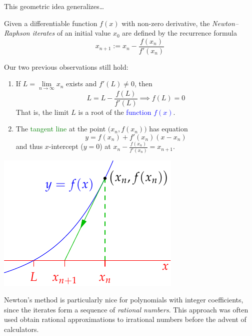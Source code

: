 \goodbreak


This geometric idea generalizes\ldots

\begin{defn}{}{}
	Given a differentiable function $f(x)$ with non-zero derivative, the \emph{Newton--Raphson iterates} of an initial value $x_0$ are defined by the recurrence formula
	\[
		x_{n+1}:=x_n-\frac{f(x_n)}{f'(x_n)}
	\]
\end{defn}

\begin{minipage}[t]{0.6\linewidth}\vspace{0pt}
	Our two previous observations still hold:
	\begin{enumerate}
	  \item If $L=\lim\limits_{n\to\infty}x_n$ exists and $f'(L)\neq 0$, then
	  \[
	  	L=L-\frac{f(L)}{f'(L)}\implies f(L)=0
	  \]
		That is, the limit $L$ is a root of the \textcolor{blue}{function $f(x)$}.
		\item The \textcolor{Green}{tangent line} at the point $\bigl(x_n,f(x_n)\bigr)$ has equation
		\[
			y=f(x_n)+f'(x_n)(x-x_n)
		\]
		and thus $x$-intercept ($y=0$) at $x_n-\frac{f(x_n)}{f'(x_n)} =x_{n+1}$.
	\end{enumerate}
\end{minipage}
\hfill
\begin{minipage}[t]{0.39\linewidth}\vspace{0pt}
	\flushright\includegraphics{newton-raphson3}
\end{minipage}\bigbreak

Newton's method is particularly nice for polynomials with integer coefficients, since the iterates form a sequence of \emph{rational numbers}. This approach was often used obtain rational approximations to irrational numbers before the advent of calculators.


	

